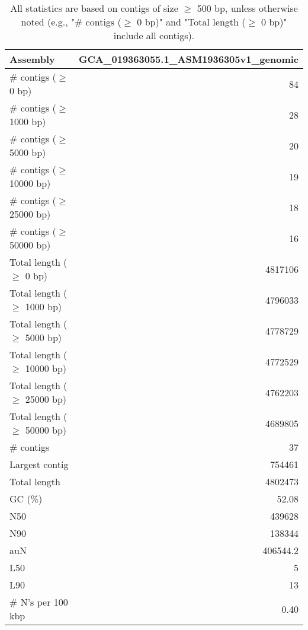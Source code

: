 \documentclass[12pt,a4paper]{article}
\begin{document}
\begin{table}[ht]
\begin{center}
\caption{All statistics are based on contigs of size $\geq$ 500 bp, unless otherwise noted (e.g., "\# contigs ($\geq$ 0 bp)" and "Total length ($\geq$ 0 bp)" include all contigs).}
\begin{tabular}{|l*{1}{|r}|}
\hline
Assembly & GCA\_019363055.1\_ASM1936305v1\_genomic \\ \hline
\# contigs ($\geq$ 0 bp) & 84 \\ \hline
\# contigs ($\geq$ 1000 bp) & 28 \\ \hline
\# contigs ($\geq$ 5000 bp) & 20 \\ \hline
\# contigs ($\geq$ 10000 bp) & 19 \\ \hline
\# contigs ($\geq$ 25000 bp) & 18 \\ \hline
\# contigs ($\geq$ 50000 bp) & 16 \\ \hline
Total length ($\geq$ 0 bp) & 4817106 \\ \hline
Total length ($\geq$ 1000 bp) & 4796033 \\ \hline
Total length ($\geq$ 5000 bp) & 4778729 \\ \hline
Total length ($\geq$ 10000 bp) & 4772529 \\ \hline
Total length ($\geq$ 25000 bp) & 4762203 \\ \hline
Total length ($\geq$ 50000 bp) & 4689805 \\ \hline
\# contigs & 37 \\ \hline
Largest contig & 754461 \\ \hline
Total length & 4802473 \\ \hline
GC (\%) & 52.08 \\ \hline
N50 & 439628 \\ \hline
N90 & 138344 \\ \hline
auN & 406544.2 \\ \hline
L50 & 5 \\ \hline
L90 & 13 \\ \hline
\# N's per 100 kbp & 0.40 \\ \hline
\end{tabular}
\end{center}
\end{table}
\end{document}
